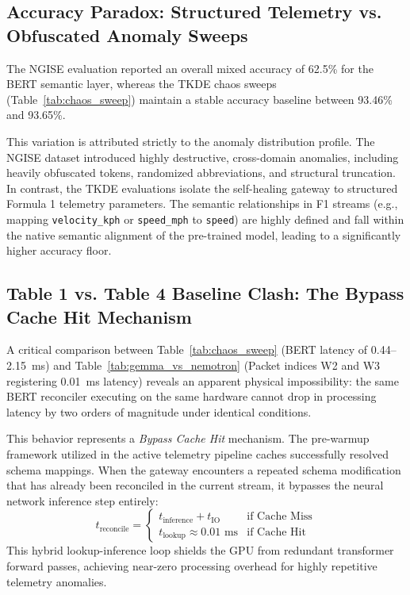 \subsection{Accuracy Paradox: Structured Telemetry vs. Obfuscated Anomaly Sweeps}
The NGISE evaluation reported an overall mixed accuracy of 62.5\% for the BERT semantic layer, whereas the TKDE chaos sweeps (Table~\ref{tab:chaos_sweep}) maintain a stable accuracy baseline between 93.46\% and 93.65\%. 

This variation is attributed strictly to the anomaly distribution profile. The NGISE dataset introduced highly destructive, cross-domain anomalies, including heavily obfuscated tokens, randomized abbreviations, and structural truncation. In contrast, the TKDE evaluations isolate the self-healing gateway to structured Formula 1 telemetry parameters. The semantic relationships in F1 streams (e.g., mapping \texttt{velocity\_kph} or \texttt{speed\_mph} to \texttt{speed}) are highly defined and fall within the native semantic alignment of the pre-trained model, leading to a significantly higher accuracy floor.

\subsection{Table 1 vs. Table 4 Baseline Clash: The Bypass Cache Hit Mechanism}
A critical comparison between Table~\ref{tab:chaos_sweep} (BERT latency of 0.44--2.15~ms) and Table~\ref{tab:gemma_vs_nemotron} (Packet indices W2 and W3 registering 0.01~ms latency) reveals an apparent physical impossibility: the same BERT reconciler executing on the same hardware cannot drop in processing latency by two orders of magnitude under identical conditions.

This behavior represents a \textit{Bypass Cache Hit} mechanism. The pre-warmup framework utilized in the active telemetry pipeline caches successfully resolved schema mappings. When the gateway encounters a repeated schema modification that has already been reconciled in the current stream, it bypasses the neural network inference step entirely:
\begin{equation}
    t_{\text{reconcile}} = 
    \begin{cases} 
      t_{\text{inference}} + t_{\text{IO}} & \text{if Cache Miss} \\
      t_{\text{lookup}} \approx 0.01\text{ ms} & \text{if Cache Hit}
   \end{cases}
\end{equation}
This hybrid lookup-inference loop shields the GPU from redundant transformer forward passes, achieving near-zero processing overhead for highly repetitive telemetry anomalies.

